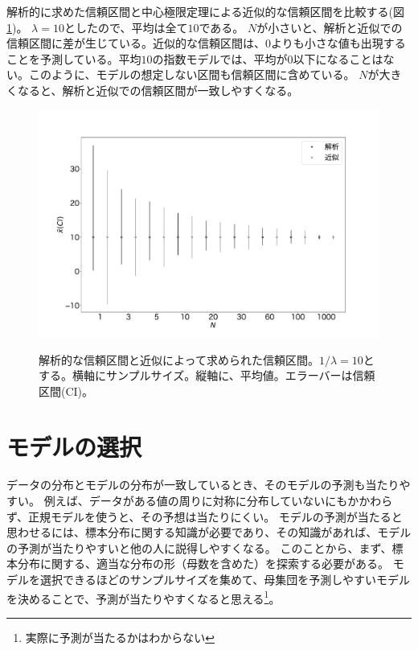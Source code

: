 解析的に求めた信頼区間と中心極限定理による近似的な信頼区間を比較する(図\ref{fig:model_predict_CI_interval})。
$\lambda=10$としたので、平均は全て$10$である。
$N$が小さいと、解析と近似での信頼区間に差が生じている。近似的な信頼区間は、$0$よりも小さな値も出現することを予測している。平均$10$の指数モデルでは、平均が$0$以下になることはない。このように、モデルの想定しない区間も信頼区間に含めている。
$N$が大きくなると、解析と近似での信頼区間が一致しやすくなる。

\begin{figure}
 \begin{center}
  \includegraphics[width=15cm]{./image/12_/confidence_expon_interval.pdf}
  \label{fig:model_predict_CI_interval}
  \caption{解析的な信頼区間と近似によって求められた信頼区間。$1/\lambda=10$とする。横軸にサンプルサイズ。縦軸に、平均値。エラーバーは信頼区間(CI)。}
 \end{center}
\end{figure}

\section{モデルの選択}
データの分布とモデルの分布が一致しているとき、そのモデルの予測も当たりやすい。
例えば、データがある値の周りに対称に分布していないにもかかわらず、正規モデルを使うと、その予想は当たりにくい。
モデルの予測が当たると思わせるには、標本分布に関する知識が必要であり、その知識があれば、モデルの予測が当たりやすいと他の人に説得しやすくなる。
このことから、まず、標本分布に関する、適当な分布の形（母数を含めた）を探索する必要がある。
モデルを選択できるほどのサンプルサイズを集めて、母集団を予測しやすいモデルを決めることで、予測が当たりやすくなると思える\footnote{実際に予測が当たるかはわからない}。

